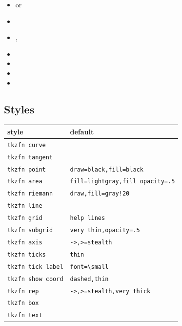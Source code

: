 \begin{itemize}
\item {} or 
\item {}
\item {}, 
\item {}
\item {}
\item {}
\item {}
\end{itemize}

\subsection{Styles}

\begin{center}
\begin{tabular}{ll}
\toprule
style & default \\
\midrule
\texttt{tkzfn curve} & \\
\texttt{tkzfn tangent} & \\
\texttt{tkzfn point} & \texttt{draw=black,fill=black} \\
\texttt{tkzfn area} & \texttt{fill=lightgray,fill opacity=.5} \\
\texttt{tkzfn riemann} & \texttt{draw,fill=gray!20} \\
\texttt{tkzfn line} & \\
\texttt{tkzfn grid} & \texttt{help lines} \\
\texttt{tkzfn subgrid} & \texttt{very thin,opacity=.5} \\
\texttt{tkzfn axis} & \texttt{->,>=stealth} \\
\texttt{tkzfn ticks} & \texttt{thin} \\
\texttt{tkzfn tick label} & \texttt{font=\textbackslash small} \\
\texttt{tkzfn show coord} & \texttt{dashed,thin} \\
\texttt{tkzfn rep} & \texttt{->,>=stealth,very thick} \\
\texttt{tkzfn box} & \\
\texttt{tkzfn text} & \\
\bottomrule
\end{tabular}
\end{center}

\endinput
